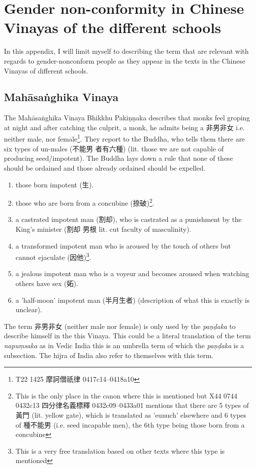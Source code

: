 \section{Gender non-conformity in Chinese Vinayas of the different schools}
\label{appendix1}

In this appendix, I will limit myself to describing the term that are relevant with regards to gender-nonconform people as they appear in the texts in the Chinese Vinayas of different schools.

\subsection{Mahāsaṅghika Vinaya}
The Mahāsaṅghika Vinaya Bhikkhu Pakiṇṇaka describes that monks feel groping at night and after catching the culprit, a monk, he admits being a 非男非女 i.e. neither male, nor female\footnote{T22 1425 摩訶僧祇律 0417c14–0418a10}. They report to the Buddha, who tells them there are six types of un-males (不能男 者有六種) (lit. those we are not capable of producing seed/impotent). The Buddha lays down a rule that none of these should be ordained and those already ordained should be expelled.

\begin{enumerate}
\item those born impotent (生). 
\item those who are born from a concubine (捺破)\footnote{This is the only place in the canon where this is mentioned but X44 0744 0432c13 四分律名義標釋 0432c09–0433a01 mentions that there are 5 types of 黃門 (lit. yellow gate), which is translated as 'eunuch' elsewhere and 6 types of 種不能男 (i.e. seed incapable men), the 6th type being those born from a concubine}.
\item a castrated impotent man (割却), who is castrated as a punishment by the King's minister (割却 男根 lit. cut faculty of masculinity).
\item a transformed impotent man who is aroused by the touch of others but cannot ejaculate (因他)\footnote{This is a very free translation based on other texts where this type is mentioned}.
\item a jealous impotent man who is a voyeur and becomes aroused when watching others have sex (妬).
\item a 'half-moon' impotent man (半月生者) (description of what this is exactly is unclear).
\end{enumerate}

The term 非男非女 (neither male nor female) is only used by the {\em paṇḍaka} to describe himself in the this Vinaya. This could be a literal translation of the term {\em napuṃsaka} as in Vedic India this is an umbrella term of which the {\em paṇḍaka} is a subsection. The hijra of India also refer to themselves with this term.

